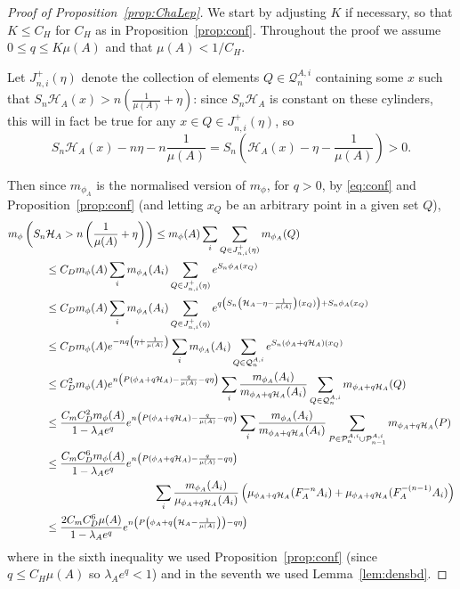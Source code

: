 \documentclass[11pt, reqno]{amsart}
\numberwithin{equation}{section}
\theoremstyle{plain}%
\theoremstyle{definition}
\def\Q{\ensuremath{\mathcal Q}}
\def\P{\ensuremath{\mathcal P}}
\renewcommand{\H}{\mathcal{H}}
\theoremstyle{nonumberplain}
\begin{document}
\begin{proof}[Proof of Proposition~\ref{prop:ChaLep}]
We start by adjusting $K$ if necessary, so that $K\le C_H$ for $C_H$ as in Proposition~\ref{prop:conf}.  Throughout the proof we assume $0\le q\le K\mu(A)$ and that $\mu(A)<1/C_H$.

Let $J_{n, i}^+(\eta)$ denote the collection of elements $Q\in \Q^{A, i}_n$ containing some $x$ such that $S_n\H_A(x)>n\left(\frac{1}{\mu(A)}+\eta\right)$: since $S_n\H_A$ is constant on these cylinders, this will in fact be true for any $x\in Q\in J_{n, i}^+(\eta)$, so  $$S_n\H_A(x) -n\eta- n\frac{1}{\mu(A)}= S_n\left(\H_A(x) -\eta- \frac{1}{\mu(A)}\right)>0.$$

 Then since $m_{\phi_A}$ is the normalised version of $m_{\phi}$, 
 for $q>0$, by \eqref{eq:conf} and Proposition~\ref{prop:conf} (and letting $x_Q$ be an arbitrary point in a given set $Q$), 
  \begin{align*}
m_{\phi}\left(S_n\H_A>n\left(\frac{1}{\mu(A)}+\eta\right)\right) &  \le {m_\phi(A)}\sum_{i}\sum_{Q\in J_{n, i}^+(\eta)}m_{\phi_A}(Q)\\
&
\hspace{-3.5cm} \le C_D{m_\phi(A)}\sum_{i}m_{\phi_A}(A_i)\sum_{Q\in J_{n, i}^+(\eta)}e^{S_n\phi_A(x_Q)}\\
 &\hspace{-3.5cm} \le  C_D{m_\phi(A)}\sum_{i}m_{\phi_A}(A_i)\sum_{Q\in J_{n, i}^+(\eta)}e^{q\left(S_n\left(\H_A-\eta-\frac{1}{\mu(A)}\right)(x_Q)\right)+S_n\phi_A(x_Q)}\\
    &\hspace{-3.5cm} \le C_D {m_\phi(A)}  e^{-nq\left(\eta+\frac{1}{\mu(A)}\right)} \sum_{i}m_{\phi_A}(A_i)
    \sum_{Q\in \Q^{A, i}_n}e^{S_n\left(\phi_A+q\H_A\right)(x_Q)}\\
  & \hspace{-3.5cm} \le C_D^2{m_\phi(A)} e^{n\left(P(\phi_A+q\H_A)-\frac{q}{\mu(A)}-q\eta\right)}\sum_{i} \frac{m_{\phi_A}(A_i)}{m_{\phi_A+q\H_A}(A_i)} \sum_{Q\in  \Q^{A,i}_n}m_{\phi_A+q\H_A}(Q) \\ 
    & \hspace{-3.5cm} \le  \frac{C_mC_D^2{m_\phi(A)}}{1-\lambda_Ae^q} e^{n\left(P(\phi_A+q\H_A)-\frac{q}{\mu(A)}-q\eta\right)}\sum_{i} \frac{m_{\phi_A}(A_i)}{m_{\phi_A+q\H_A}(A_i)} \sum_{P\in  \P^{A,i}_n\cup \P^{A, i}_{n-1}}m_{\phi_A+q\H_A}(P) \\ 
   & \hspace{-3.5cm} \le  \frac{C_mC_D^6{m_\phi(A)}}{1-\lambda_Ae^q}  e^{n\left(P(\phi_A+q\H_A)-\frac{q}{\mu(A)}-q\eta\right)}\\
   &\hspace{0cm} \sum_{i} \frac{m_{\phi_A}(A_i)}{\mu_{\phi_A+q\H_A}(A_i)} \left(\mu_{\phi_A+q\H_A}(F_A^{-n}A_i)+ \mu_{\phi_A+q\H_A}(F_A^{-(n-1)}A_i)\right) \\ 
   &\hspace{-3.5cm}\le \frac{2C_mC_D^6{\mu(A)}}{1-\lambda_Ae^q}  e^{n\left(P\left(\phi_A+q\left(\H_A-\frac{1}{\mu(A)}\right)\right)-q\eta\right)} \end{align*}
where in the sixth inequality we used Proposition~\ref{prop:conf} (since  $q\le C_H\mu(A)$ so $\lambda_Ae^q<1$) and in the seventh we used Lemma~\ref{lem:densbd}. 


\end{proof}
\end{document}

